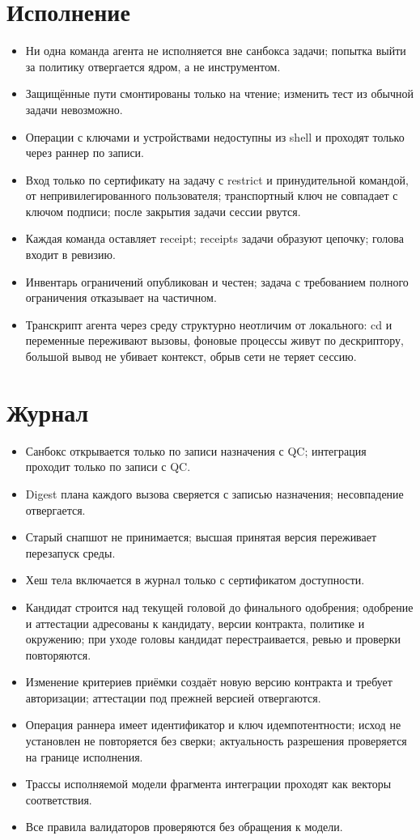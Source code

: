 \section*{Исполнение}
\begin{itemize}
\item Ни одна команда агента не исполняется вне санбокса задачи; попытка выйти за политику отвергается ядром, а не инструментом.
\item Защищённые пути смонтированы только на чтение; изменить тест из обычной задачи невозможно.
\item Операции с ключами и устройствами недоступны из shell и проходят только через раннер по записи.
\item Вход только по сертификату на задачу с restrict и принудительной командой, от непривилегированного пользователя; транспортный ключ не совпадает с ключом подписи; после закрытия задачи сессии рвутся.
\item Каждая команда оставляет receipt; receipts задачи образуют цепочку; голова входит в ревизию.
\item Инвентарь ограничений опубликован и честен; задача с требованием полного ограничения отказывает на частичном.
\item Транскрипт агента через среду структурно неотличим от локального: cd и переменные переживают вызовы, фоновые процессы живут по дескриптору, большой вывод не убивает контекст, обрыв сети не теряет сессию.
\end{itemize}

\section*{Журнал}
\begin{itemize}
\item Санбокс открывается только по записи назначения с QC; интеграция проходит только по записи с QC.
\item Digest плана каждого вызова сверяется с записью назначения; несовпадение отвергается.
\item Старый снапшот не принимается; высшая принятая версия переживает перезапуск среды.
\item Хеш тела включается в журнал только с сертификатом доступности.
\item Кандидат строится над текущей головой до финального одобрения; одобрение и аттестации адресованы к кандидату, версии контракта, политике и окружению; при уходе головы кандидат перестраивается, ревью и проверки повторяются.
\item Изменение критериев приёмки создаёт новую версию контракта и требует авторизации; аттестации под прежней версией отвергаются.
\item Операция раннера имеет идентификатор и ключ идемпотентности; исход не установлен не повторяется без сверки; актуальность разрешения проверяется на границе исполнения.
\item Трассы исполняемой модели фрагмента интеграции проходят как векторы соответствия.
\item Все правила валидаторов проверяются без обращения к модели.
\end{itemize}

